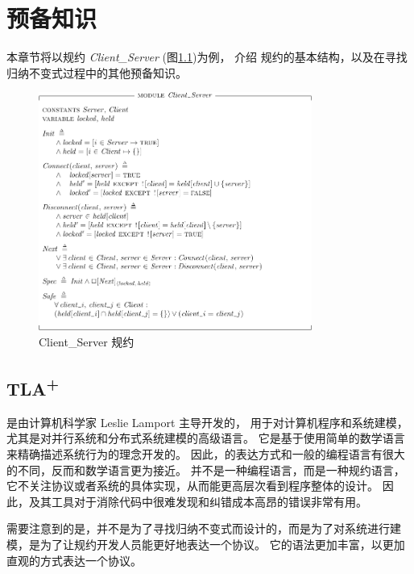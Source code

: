 \chapter{预备知识}\label{chap:pre-knowleage}

本章节将以规约 \textit{Client\_Server} (图\ref{fig:client_server})为例，
介绍 \TLA 规约的基本结构，以及在寻找归纳不变式过程中的其他预备知识。
\begin{figure}
    \centering
    \includegraphics[width=0.8\textwidth]{figures/Client_Server.pdf}
    \caption{Client\_Server 规约}
    \label{fig:client_server}
\end{figure}

\section{\texorpdfstring{TLA\textsuperscript{+}}{TLA+}}
\href{https://lamport.azurewebsites.net/tla/tla.html}{\TLA} \cite{TLA}是由计算机科学家 Leslie Lamport 主导开发的，
用于对计算机程序和系统建模，尤其是对并行系统和分布式系统建模的高级语言。
它是基于使用简单的数学语言来精确描述系统行为的理念开发的。
因此，\TLA 的表达方式和一般的编程语言有很大的不同，反而和数学语言更为接近。
\TLA 并不是一种编程语言，而是一种规约语言，它不关注协议或者系统的具体实现，从而能更高层次看到程序整体的设计。
因此，\TLA 及其工具对于消除代码中很难发现和纠错成本高昂的错误非常有用。

需要注意到的是，\TLA 并不是为了寻找归纳不变式而设计的，而是为了对系统进行建模，是为了让规约开发人员能更好地表达一个协议。
它的语法更加丰富，以更加直观的方式表达一个协议。

